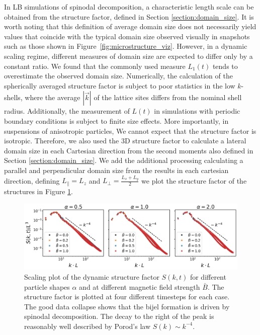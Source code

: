 In LB simulations of spinodal decomposition, a characteristic length
scale can be obtained from the structure factor, defined in Section \ref{section:domain_size}. \cite{kendon_3d_1999,kendon_inertial_2001} 
It is worth noting that this definition of average domain size does not necessarily yield values that coincide with the typical
domain size observed visually in snapshots such as those shown in Figure~\ref{fig:microstructure_viz}. However, in a dynamic
scaling regime, different measures of domain size are expected to differ only by a constant ratio. We found that the commonly 
used measure \(L_1(t)\) tends to overestimate the observed domain size. Numerically, the calculation of the spherically 
averaged structure factor is subject to poor statistics in the low \(k\)-shells, where the average \(|\vec{k}|\) of the 
lattice sites differs from the nominal shell radius. Additionally, the measurement of \(L(t)\) in simulations with
periodic boundary conditions is subject to finite size effects. More importantly, in suspensions of anisotropic particles, 
We cannot expect that the structure factor is isotropic. Therefore, we also used the 3D structure factor to calculate a lateral domain 
size in each Cartesian direction from the second moments also defined in Section \ref{section:domain_size}. 
\cite{jansen_bijels_2011,gunther_timescales_2014} We add the additional processing calculating a parallel and perpendicular domain size
from the results in each cartesian direction, defining $L_{\parallel}=L_z$ and $L_{\perp} = \frac{L_x+L_y}{2}$ we plot the structure factor of the structures in
Figure \ref{fig:structure_factor}.

\begin{figure}
    \centering
    \includegraphics[width=\textwidth]{figures/results/paper1/structure_factor.png}
    \caption{Scaling plot of the dynamic structure factor $S(k,t)$ for different particle shapes $\alpha$ and at different 
            magnetic field strength $\bar{B}$. The structure factor is plotted at four different timesteps for each case. The good data collapse shows that the 
            bijel formation is driven by spinodal decomposition. The decay to the right of the peak is reasonably well described by Porod's law $S(k)\sim k^{-4}$.}
    \label{fig:structure_factor}
\end{figure}

